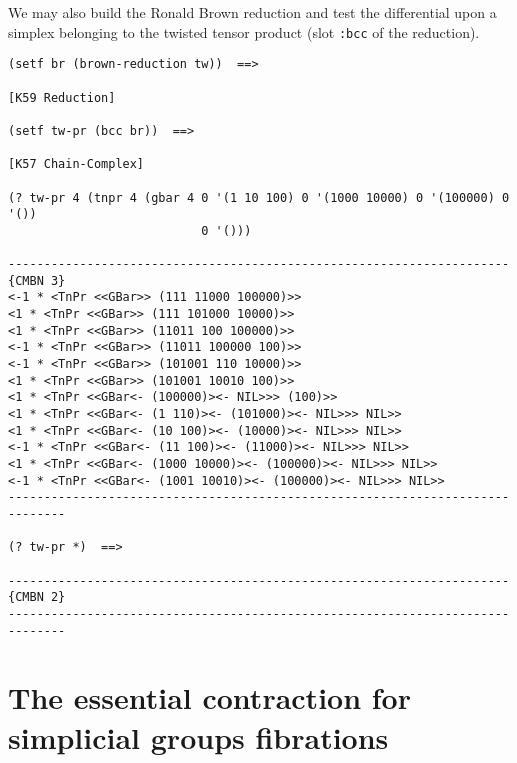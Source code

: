 We may also build the Ronald Brown reduction and test the differential
upon a simplex belonging to the twisted tensor product (slot {\tt :bcc} of the
reduction).
{\footnotesize\begin{verbatim}
(setf br (brown-reduction tw))  ==>

[K59 Reduction]

(setf tw-pr (bcc br))  ==>

[K57 Chain-Complex]

(? tw-pr 4 (tnpr 4 (gbar 4 0 '(1 10 100) 0 '(1000 10000) 0 '(100000) 0 '())
                           0 '()))

----------------------------------------------------------------------{CMBN 3}
<-1 * <TnPr <<GBar>> (111 11000 100000)>>
<1 * <TnPr <<GBar>> (111 101000 10000)>>
<1 * <TnPr <<GBar>> (11011 100 100000)>>
<-1 * <TnPr <<GBar>> (11011 100000 100)>>
<-1 * <TnPr <<GBar>> (101001 110 10000)>>
<1 * <TnPr <<GBar>> (101001 10010 100)>>
<1 * <TnPr <<GBar<- (100000)><- NIL>>> (100)>>
<1 * <TnPr <<GBar<- (1 110)><- (101000)><- NIL>>> NIL>>
<1 * <TnPr <<GBar<- (10 100)><- (10000)><- NIL>>> NIL>>
<-1 * <TnPr <<GBar<- (11 100)><- (11000)><- NIL>>> NIL>>
<1 * <TnPr <<GBar<- (1000 10000)><- (100000)><- NIL>>> NIL>>
<-1 * <TnPr <<GBar<- (1001 10010)><- (100000)><- NIL>>> NIL>>
------------------------------------------------------------------------------

(? tw-pr *)  ==>

----------------------------------------------------------------------{CMBN 2}
------------------------------------------------------------------------------
\end{verbatim}}

\section {The essential contraction for simplicial groups fibrations}

